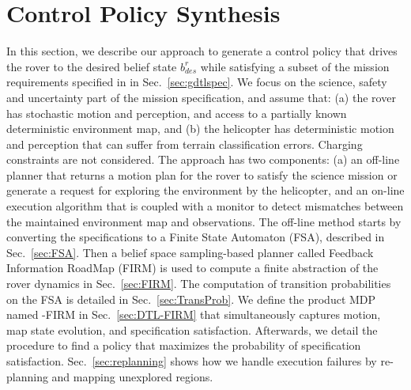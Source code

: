 \documentclass[letterpaper]{article} %
\begin{document}
	
\section{Control Policy Synthesis} \label{sec:planner}
In this section, we describe our approach to generate a control policy that drives the rover to the desired belief state $b^r_{des}$ while satisfying a subset of the mission requirements specified in \DTL in Sec.~\ref{sec:gdtlspec}.
We focus on the science, safety and uncertainty part of the mission specification, and assume that: (a) the rover has stochastic motion and perception, and access to a partially known deterministic environment map, and (b) the helicopter has deterministic motion and perception that can suffer from terrain classification errors.
Charging constraints are not considered.
The approach has two components: (a) an off-line planner that returns a motion plan for the rover to satisfy the science mission or generate a request for exploring the environment by the helicopter, and an on-line execution algorithm that is coupled with a monitor to detect mismatches between the maintained environment map and observations.
The off-line method starts by converting the \DTL specifications to a Finite State Automaton (FSA), described in Sec.~\ref{sec:FSA}. Then a belief space sampling-based planner called Feedback Information RoadMap (FIRM) is used to compute a finite abstraction of the rover dynamics in Sec.~\ref{sec:FIRM}. The computation of transition probabilities on the FSA is detailed in Sec.~\ref{sec:TransProb}. We define the product MDP named \DTL-FIRM in Sec.~\ref{sec:DTL-FIRM} that simultaneously captures motion, map state evolution, and specification satisfaction. Afterwards, we detail the procedure to find a policy that maximizes the probability of specification satisfaction. Sec.~\ref{sec:replanning} shows how we handle execution failures by re-planning and mapping unexplored regions.

\end{document}
